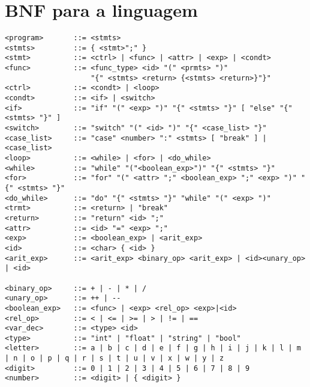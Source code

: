 \section{BNF para a linguagem}
\begin{lstlisting}
<program>       ::= <stmts>
<stmts>         ::= { <stmt>";" }
<stmt>          ::= <ctrl> | <func> | <attr> | <exp> | <condt>
<func>          ::= <func_type> <id> "(" <prmts> ")"
                    "{" <stmts> <return> {<stmts> <return>}"}"
<ctrl>          ::= <condt> | <loop>
<condt>         ::= <if> | <switch>
<if>            ::= "if" "(" <exp> ")" "{" <stmts> "}" [ "else" "{" <stmts> "}" ]
<switch>        ::= "switch" "(" <id> ")" "{" <case_list> "}"
<case_list>     ::= "case" <number> ":" <stmts> [ "break" ] | <case_list>
<loop>          ::= <while> | <for> | <do_while>
<while>         ::= "while" "("<boolean_exp>")" "{" <stmts> "}"
<for>           ::= "for" "(" <attr> ";" <boolean_exp> ";" <exp> ")" "{" <stmts> "}"
<do_while>      ::= "do" "{" <stmts> "}" "while" "(" <exp> ")"
<trmt>          ::= <return> | "break"
<return>        ::= "return" <id> ";"
<attr>          ::= <id> "=" <exp> ";"
<exp>           ::= <boolean_exp> | <arit_exp>
<id>            ::= <char> { <id> }
<arit_exp>      ::= <arit_exp> <binary_op> <arit_exp> | <id><unary_op> | <id>

<binary_op>     ::= + | - | * | /
<unary_op>      ::= ++ | --
<boolean_exp>   ::= <func> | <exp> <rel_op> <exp>|<id>
<rel_op>        ::= < | <= | >= | > | != | ==
<var_dec>       ::= <type> <id>
<type>          ::= "int" | "float" | "string" | "bool"
<letter>        ::= a | b | c | d | e | f | g | h | i | j | k | l | m | n | o | p | q | r | s | t | u | v | x | w | y | z
<digit>         ::= 0 | 1 | 2 | 3 | 4 | 5 | 6 | 7 | 8 | 9
<number>        ::= <digit> | { <digit> }
\end{lstlisting}
